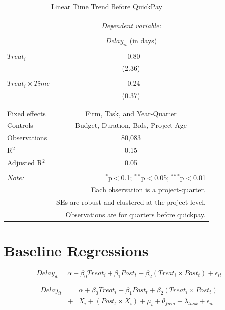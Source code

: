 \documentclass[]{article}
\begin{document}
\begin{table}[H] \centering 
  \caption{Linear Time Trend Before QuickPay} 
  \label{} 
\small 
\begin{tabular}{@{\extracolsep{5pt}}lc} 
\\[-1.8ex]\hline 
\hline \\[-1.8ex] 
 & \multicolumn{1}{c}{\textit{Dependent variable:}} \\ 
\cline{2-2} 
\\[-1.8ex] & $Delay_{it}$ (in days) \\ 
\hline \\[-1.8ex] 
 $Treat_i$ & $-$0.80 \\ 
  & (2.36) \\ 
  & \\ 
 $Treat_i \times Time$ & $-$0.24 \\ 
  & (0.37) \\ 
  & \\ 
\hline \\[-1.8ex] 
Fixed effects & Firm, Task, and Year-Quarter \\ 
Controls & Budget, Duration, Bids, Project Age \\ 
Observations & 80,083 \\ 
R$^{2}$ & 0.15 \\ 
Adjusted R$^{2}$ & 0.05 \\ 
\hline 
\hline \\[-1.8ex] 
\textit{Note:}  & \multicolumn{1}{r}{$^{*}$p$<$0.1; $^{**}$p$<$0.05; $^{***}$p$<$0.01} \\ 
 & \multicolumn{1}{r}{Each observation is a project-quarter.} \\ 
 & \multicolumn{1}{r}{SEs are robust and clustered at the project level.} \\ 
 & \multicolumn{1}{r}{Observations are for quarters before quickpay.} \\ 
\end{tabular} 
\end{table}

\hypertarget{baseline-regressions}{%
\section{Baseline Regressions}\label{baseline-regressions}}

\[ Delay_{it} = \alpha+\beta_0 Treat_i + \beta_1 Post_t + \beta_2 (Treat_i \times Post_t) + \epsilon_{it}\]

\[ \begin{aligned} Delay_{it} &=& \alpha+\beta_0 Treat_i + \beta_1 Post_t + \beta_2 (Treat_i \times Post_t)\\
&+&  X_i + (Post_t \times X_i) + \mu_t + \theta_{firm} + \lambda_{task}+ \epsilon_{it}
\end{aligned}\]
\end{document}
